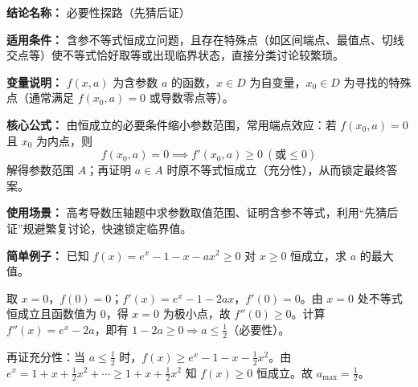 \textbf{结论名称：} 必要性探路（先猜后证）

\textbf{适用条件：} 含参不等式恒成立问题，且存在特殊点（如区间端点、最值点、切线交点等）使不等式恰好取等或出现临界状态，直接分类讨论较繁琐。

\textbf{变量说明：} $f(x,a)$ 为含参数 $a$ 的函数，$x\in D$ 为自变量，$x_0\in D$ 为寻找的特殊点（通常满足 $f(x_0,a)=0$ 或导数零点等）。

\textbf{核心公式：} 由恒成立的必要条件缩小参数范围，常用端点效应：若 $f(x_0,a)=0$ 且 $x_0$ 为内点，则
\[
\boxed{f(x_0,a)=0 \implies f'(x_0,a)\ge 0 \ (\text{或}\le 0)}
\]
解得参数范围 $A$；再证明 $a\in A$ 时原不等式恒成立（充分性），从而锁定最终答案。

\textbf{使用场景：} 高考导数压轴题中求参数取值范围、证明含参不等式，利用“先猜后证”规避繁复讨论，快速锁定临界值。

\textbf{简单例子：} 已知 $f(x)=e^x-1-x-ax^2\ge 0$ 对 $x\ge 0$ 恒成立，求 $a$ 的最大值。

取 $x=0$，$f(0)=0$；$f'(x)=e^x-1-2ax$，$f'(0)=0$。由 $x=0$ 处不等式恒成立且函数值为 $0$，得 $x=0$ 为极小点，故 $f''(0)\ge 0$。计算 $f''(x)=e^x-2a$，即有 $1-2a\ge 0\Rightarrow a\le \frac12$（必要性）。

再证充分性：当 $a\le\frac12$ 时，$f(x)\ge e^x-1-x-\frac12x^2$。由 $e^x=1+x+\frac12x^2+\cdots\ge 1+x+\frac12x^2$ 知 $f(x)\ge 0$ 恒成立。故 $a_{\max}=\frac12$。